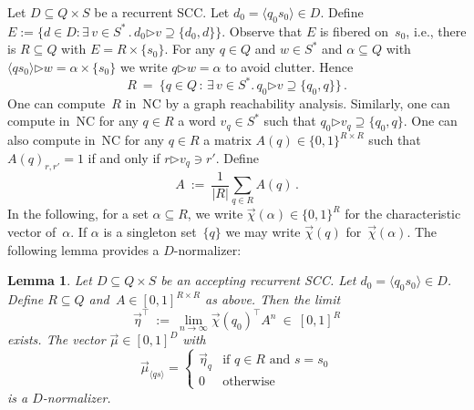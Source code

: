 \documentclass{elsarticle}
\newtheorem{lemma}[definition]{Lemma}
\def\<{\langle}
\def\>{\rangle}
\newcommand{\then}{\mathord{\triangleright}}
\begin{document}
Let $D \subseteq Q \times S$ be a recurrent SCC.
Let $d_0 = \<q_0 s_0\> \in D$.
Define $E := \{d \in D : \exists\, v \in S^*\,.\, d_0 \then v \supseteq \{d_0,d\}\}$.
Observe that $E$ is fibered on~$s_0$, i.e., there is $R \subseteq Q$ with $E = R \times \{s_0\}$.
For any $q \in Q$ and $w \in S^*$ and $\alpha \subseteq Q$ with $\<q s_0\> \then w = \alpha \times \{s_0\}$ we write $q \then w = \alpha$ to avoid clutter.
Hence
\[
 R \ = \ \{q \in Q \,:\, \exists\, v \in S^* .\, q_0 \then v \supseteq \{q_0, q\}\}\,.
\]
One can compute~$R$ in~NC by a graph reachability analysis.
Similarly, one can compute in~NC for any $q \in R$ a word $v_q \in S^*$ such that $q_0 \then v_q \supseteq \{q_0,q\}$.
One can also compute in~NC for any $q \in R$ a matrix $A(q) \in \{0,1\}^{R \times R}$ such that $A(q)_{r,r'} = 1$ if and only if $r \then v_q \ni r'$.
Define
\[
 A \ := \ \frac{1}{|R|} \sum_{q \in R} A(q) \,.
\]
In the following, for a set $\alpha \subseteq R$, we write $\vec{\chi}(\alpha) \in \{0,1\}^R$ for the characteristic vector of~$\alpha$. If $\alpha$ is a singleton set~$\{q\}$ we may write $\vec{\chi}(q)$ for~$\vec{\chi}(\alpha)$.
The following lemma provides a $D$-normalizer:
\begin{lemma} \label{lem:A-limit}
Let $D \subseteq Q \times S$ be an accepting recurrent SCC.
Let $d_0 = \<q_0 s_0\> \in D$.
Define $R \subseteq Q$ and~$A \in [0,1]^{R \times R}$ as above.
Then the limit
\[
 \vec{\eta}^\top \ := \ \lim_{n \to \infty} \vec{\chi}(q_0)^\top A^n \ \in \ [0,1]^R
\]
exists.
The vector $\vec{\mu} \in [0,1]^D$ with
\[
\vec{\mu}_{\<q s\>} =
\begin{cases}
    \vec{\eta}_{q} & \text{if } q \in R \text{ and } s = s_0 \\[0.5ex]
    0 & \text{otherwise}
\end{cases}
\]
is a $D$-normalizer.
\end{lemma}
\end{document}

